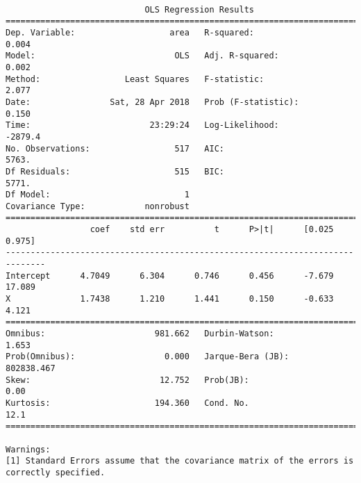 \documentclass[11pt]{article}
\begin{document}
    \begin{Verbatim}[commandchars=\\\{\}]

                            OLS Regression Results                            
==============================================================================
Dep. Variable:                   area   R-squared:                       0.004
Model:                            OLS   Adj. R-squared:                  0.002
Method:                 Least Squares   F-statistic:                     2.077
Date:                Sat, 28 Apr 2018   Prob (F-statistic):              0.150
Time:                        23:29:24   Log-Likelihood:                -2879.4
No. Observations:                 517   AIC:                             5763.
Df Residuals:                     515   BIC:                             5771.
Df Model:                           1                                         
Covariance Type:            nonrobust                                         
==============================================================================
                 coef    std err          t      P>|t|      [0.025      0.975]
------------------------------------------------------------------------------
Intercept      4.7049      6.304      0.746      0.456      -7.679      17.089
X              1.7438      1.210      1.441      0.150      -0.633       4.121
==============================================================================
Omnibus:                      981.662   Durbin-Watson:                   1.653
Prob(Omnibus):                  0.000   Jarque-Bera (JB):           802838.467
Skew:                          12.752   Prob(JB):                         0.00
Kurtosis:                     194.360   Cond. No.                         12.1
==============================================================================

Warnings:
[1] Standard Errors assume that the covariance matrix of the errors is correctly specified.



\end{Verbatim}
\end{document}
